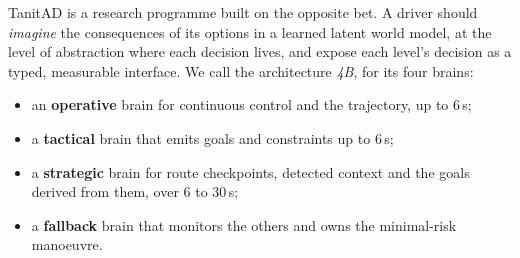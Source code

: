\documentclass[10pt,twocolumn]{article}
\theoremstyle{remark}
\begin{document}
TanitAD is a research programme built on the opposite bet. A driver should \emph{imagine} the consequences of its options in a
learned latent world model, at the level of abstraction where each decision lives, and expose each level's decision as a typed,
measurable interface. We call the architecture \emph{4B}, for its four brains:
\begin{itemize}
  \item an \textbf{operative} brain for continuous control and the trajectory, up to 6\,s;
  \item a \textbf{tactical} brain that emits goals and constraints up to 6\,s;
  \item a \textbf{strategic} brain for route checkpoints, detected context and the goals derived from them, over 6 to 30\,s;
  \item a \textbf{fallback} brain that monitors the others and owns the minimal-risk manoeuvre.
\end{itemize}
\end{document}
